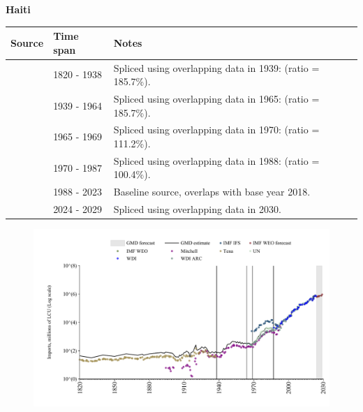 \documentclass[12pt,a4paper,landscape]{article}
\begin{document}
\begin{adjustbox}{max totalsize={\paperwidth}{\paperheight},center}
\begin{minipage}[t][\textheight][t]{\textwidth}
\vspace*{0.5cm}
{}
\begin{center}
{\Large\bfseries Haiti}
\end{center}
\vspace{0.5cm}
\begin{table}[H]
\centering
\small
\begin{tabular}{|l|l|l|}
\hline
\textbf{Source} & \textbf{Time span} & \textbf{Notes} \\
\hline
\rowcolor{white}\cite{Tena}& 1820 - 1938 &Spliced using overlapping data in 1939: (ratio = 185.7\%).\\
\rowcolor{lightgray}\cite{Mitchell}& 1939 - 1964 &Spliced using overlapping data in 1965: (ratio = 185.7\%).\\
\rowcolor{white}\cite{WDI_ARC}& 1965 - 1969 &Spliced using overlapping data in 1970: (ratio = 111.2\%).\\
\rowcolor{lightgray}\cite{UN}& 1970 - 1987 &Spliced using overlapping data in 1988: (ratio = 100.4\%).\\
\rowcolor{white}\cite{WDI}& 1988 - 2023 &Baseline source, overlaps with base year 2018.\\
\rowcolor{lightgray}\cite{IMF_WEO_forecast}& 2024 - 2029 &Spliced using overlapping data in 2030.\\
\hline
\end{tabular}
\end{table}
\begin{figure}[H]
\centering
\includegraphics[width=\textwidth,height=0.6\textheight,keepaspectratio]{graphs/HTI_imports.pdf}
\end{figure}
\end{minipage}
\end{adjustbox}
\end{document}
